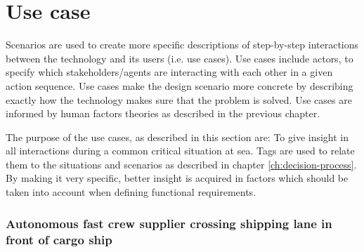 \section{Use case}
Scenarios are used to create more specific descriptions of step-by-step interactions between the technology and its users (i.e. use cases). Use cases include actors, to specify which stakeholders/agents are interacting with each other in a given action sequence.
Use cases make the design scenario more concrete by describing exactly how the technology makes sure that the problem is solved. Use cases are informed by human factors theories as described in the previous chapter.


The purpose of the use cases, as described in this section are: To give insight in all interactions during a common critical situation at sea. Tags are used to relate them to the situations and scenarios as described in chapter \ref{ch:decision-process}. By making it very specific, better insight is acquired in factors which should be taken into account when defining functional requirements. 

\subsubsection{Autonomous fast crew supplier crossing shipping lane in front of cargo ship}

